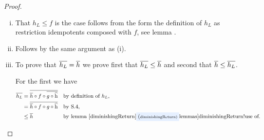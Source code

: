 \begin{proof}\leavevmode\par
\begin{enumerate}[(i)]
\item %
That $h_L \leq f$
is the case
follows from the form the definition
of $h_L$  as restriction idempotents
composed with $f$,
see lemma .

\item %
Follows by the same argument as (i).

\item %
To prove that $\rst{h_L}=\rst{h}$ 
we prove first that $\rst{h_L}\leq \rst{h}$
and second that $\rst{h} \leq \rst{h_L}$.

For the first we have 
\begin{align*}
\rst{h_L}
    &= \rst{\rst{h} \circ f \circ \rst{g \circ \rng{h}}}
         && \mbox{by definition of $h_L$,}\\
    &= \rst{\rst{h} \circ f \circ g \circ \rng{h}}
        && \mbox{by S.4,}\\
    &\leq \rst{h} 
        && \mbox{by lemma \lref{diminishingReturn}.}
\end{align*}


\end{enumerate}
\end{proof}
